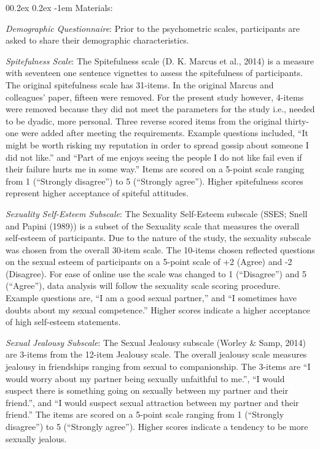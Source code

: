 \documentclass[
  english,
  donotrepeattitle,doc, 12pt, a4paper,floatsintext]{apa7}
\makeatletter
\let\oldparagraph\paragraph
\renewcommand{\paragraph}[1]{\oldparagraph{#1}\mbox{}}
\renewcommand{\paragraph}{\@startsection{paragraph}{4}{\parindent}%
  {0\baselineskip \@plus 0.2ex \@minus 0.2ex}%
  {-1em}%
  {\normalfont\normalsize\bfseries\itshape\typesectitle}}
\makeatother
\begin{document}
\hypertarget{materials}{%
\paragraph{Materials:}\label{materials}}

\emph{Demographic Questionnaire}: Prior to the psychometric scales, participants are asked to share their demographic characteristics.

\emph{Spitefulness Scale}: The Spitefulness scale (D. K. Marcus et al., 2014) is a measure with seventeen one sentence vignettes to assess the spitefulness of participants. The original spitefulness scale has 31-items. In the original Marcus and colleagues' paper, fifteen were removed. For the present study however, 4-items were removed because they did not meet the parameters for the study i.e., needed to be dyadic, more personal. Three reverse scored items from the original thirty-one were added after meeting the requirements. Example questions included, ``It might be worth risking my reputation in order to spread gossip about someone I did not like.'' and ``Part of me enjoys seeing the people I do not like fail even if their failure hurts me in some way.'' Items are scored on a 5-point scale ranging from 1 (``Strongly disagree'') to 5 (``Strongly agree''). Higher spitefulness scores represent higher acceptance of spiteful attitudes.

\emph{Sexuality Self-Esteem Subscale}: The Sexuality Self-Esteem subscale (SSES; Snell and Papini (1989)) is a subset of the Sexuality scale that measures the overall self-esteem of participants. Due to the nature of the study, the sexuality subscale was chosen from the overall 30-item scale. The 10-items chosen reflected questions on the sexual esteem of participants on a 5-point scale of +2 (Agree) and -2 (Disagree). For ease of online use the scale was changed to 1 (``Disagree'') and 5 (``Agree''), data analysis will follow the sexuality scale scoring procedure. Example questions are, ``I am a good sexual partner,'' and ``I sometimes have doubts about my sexual competence.'' Higher scores indicate a higher acceptance of high self-esteem statements.

\emph{Sexual Jealousy Subscale}: The Sexual Jealousy subscale (Worley \& Samp, 2014) are 3-items from the 12-item Jealousy scale. The overall jealousy scale measures jealousy in friendships ranging from sexual to companionship. The 3-items are ``I would worry about my partner being sexually unfaithful to me.'', ``I would suspect there is something going on sexually between my partner and their friend.'', and ``I would suspect sexual attraction between my partner and their friend.'' The items are scored on a 5-point scale ranging from 1 (``Strongly disagree'') to 5 (``Strongly agree''). Higher scores indicate a tendency to be more sexually jealous.
\end{document}
